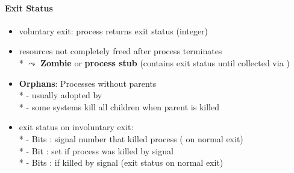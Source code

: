 \paragraph{Exit Status}
\begin{itemize}
  \item voluntary exit: process returns exit status (integer)
  \item resources not completely freed after process terminates \\*
    \( \leadsto \) \textbf{Zombie} or \textbf{process stub} (contains exit status until collected via )
  \item \textbf{Orphans}: Processes without parents \\*
    - usually adopted by  \\*
    - some systems kill all children when parent is killed
  \item exit status on involuntary exit: \\*
    - Bits : signal number that killed process ( on normal exit) \\*
    - Bit : set if process was killed by signal \\*
    - Bits :  if killed by signal (exit status on normal exit)
\end{itemize}

